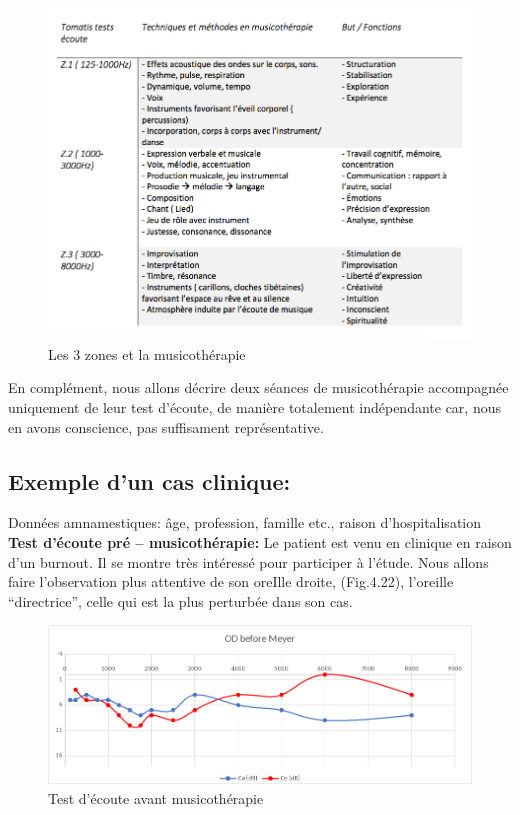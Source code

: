 \begin{figure}[tbh]
	\centering
	\includegraphics[width=1\linewidth]{images/testtechnmethbut}
	\caption[Zones du test avec la musicothérapie]{Les 3 
          zones et la musicothérapie}
       
	\label{testbutetfonction}
\end{figure}

 
   
En complément, nous allons décrire deux séances de
musicothérapie accompagnée uniquement de leur test d'écoute, de
manière totalement indépendante car, nous en avons conscience, pas
suffisament représentative.

\subsection{Exemple d'un cas clinique:}

Données amnamestiques: âge, profession, famille etc., raison d'hospitalisation
\textbf{ Test d'écoute pré -- musicothérapie:}
 	Le patient est venu en clinique en raison d'un burnout. Il se montre très
        intéressé pour participer à l'étude. Nous allons faire
        l'observation plus attentive de 
        son oreIlle droite, (Fig.4.22), l'oreille ``directrice'',
        celle qui est la plus perturbée dans son cas.
 
 	
 	\begin{figure}[tbh]
 		\centering
 		\includegraphics[width=0.7\linewidth]{images/clinique/od_before_meyer.png}
 		\caption{Test d'écoute avant musicothérapie}
 		\label{fig:odbeforemeyer}
 	\end{figure}
 	

